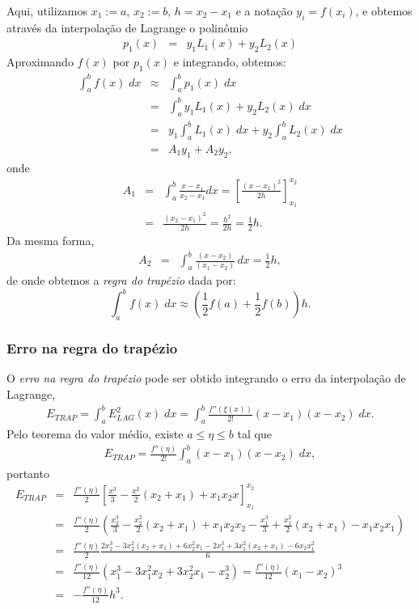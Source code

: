 Aqui, utilizamos $x_1:=a$,  $x_2:=b$, $h=x_2-x_1$ e a notação $y_i=f(x_i)$, e obtemos através da interpolação de Lagrange o polinômio
\begin{eqnarray}
p_1(x) &=& y_1 L_1(x)+ y_2 L_2(x)
\end{eqnarray}
Aproximando $f(x)$ por $p_1(x)$ e integrando, obtemos:
\begin{eqnarray}
  \int_a^bf(x)\;dx &\approx& \int_a^bp_1(x)\;dx \\
    &=& \int_a^b y_1L_1(x) + y_2L_2(x)\;dx \\
    &=& y_1 \int_a^b L_1(x)\;dx + y_2 \int_a^b L_2(x)\;dx \\
    &=& A_1 y_1 + A_2 y_2,
\end{eqnarray}
onde
\begin{eqnarray}
  A_1 &=& \int_a^b\frac{x-x_1}{x_2-x_1}dx =  \left[\frac{(x-x_1)^2}{2h}\right]_{x_1}^{x_2}\\
      &=& \frac{(x_2-x_1)^2}{2h} = \frac{h^2}{2h} = \frac{1}{2}h.
\end{eqnarray}
Da mesma forma,
\begin{eqnarray}
  A_2 &=& \int_a^b\frac{(x-x_2)}{(x_1-x_2)}\,dx = \frac{1}{2}h,
\end{eqnarray}
de onde obtemos a \emph{regra do trapézio} dada por:
\begin{equation}
  \int_a^b f(x)\;dx \approx \left(\frac{1}{2}f(a) + \frac{1}{2}f(b)\right)h.
\end{equation}


\subsubsection{Erro na regra do trapézio}
O \textit{erro na regra do trapézio} pode ser obtido integrando o erro da interpolação de Lagrange,
\begin{eqnarray}
   E_{TRAP} = \int_a^b E^2_{LAG}(x) \;dx= \int_a^b \frac{f''(\xi(x))}{2!}(x-x_1)(x-x_2) \;dx.
\end{eqnarray}
Pelo teorema do valor médio, existe $a\leq \eta\leq b$ tal que
\begin{eqnarray}
    E_{TRAP} = \frac{f''(\eta)}{2!}\int_a^b (x-x_1)(x-x_2) \;dx,
\end{eqnarray}
portanto
\begin{eqnarray}
     E_{TRAP}
  &=& \frac{f''(\eta)}{2}\left[\frac{x^3}{3}-\frac{x^2}{2}(x_2+x_1)+x_1x_2x\right]_{x_1}^{x_2}\\
  &=& \frac{f''(\eta)}{2}\left(\frac{x_2^3}{3}-\frac{x_2^2}{2}(x_2+x_1)+x_1x_2x_2-\frac{x_1^3}{3}+\frac{x_1^2}{2}(x_2+x_1)-x_1x_2x_1\right)\\
  &=& \frac{f''(\eta)}{2}\frac{2x_2^3-3x_2^2(x_2+x_1)+6x_2^2x_1-2x_1^3+3x_1^2(x_2+x_1)-6x_2x_1^2}{6}\\
  &=& \frac{f''(\eta)}{12}\left(x_1^3-3x_1^2x_2+3x_2^2x_1-x_2^3\right)
   =  \frac{f''(\eta)}{12}(x_1-x_2)^3\\
  &=& -\frac{f''(\eta)}{12}h^3.
\end{eqnarray}

